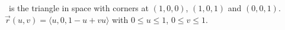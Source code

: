 {\surfaceS\ is the triangle in space with corners at $(1,0,0)$, $(1,0,1)$ and $(0,0,1)$.
}
{$\vec r(u,v) = \langle u, 0, 1-u+vu\rangle$ with $0\leq u\leq 1$, $0\leq v\leq 1$.
}

